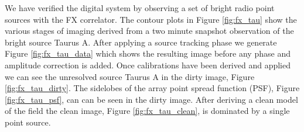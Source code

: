 \documentclass[useAMS,macros,usenatbib]{mn2e}
\begin{document}
%

We have verified the digital system by observing a set of bright radio point sources with the FX correlator.
The contour plots in Figure \ref{fig:fx_tau} show the various stages of imaging derived from a two minute snapshot observation of the bright source Taurus A.
After applying a source tracking phase we generate Figure \ref{fig:fx_tau_data} which shows the resulting image before any phase and amplitude correction is added.
Once calibrations have been derived and applied we can see the unresolved source Taurus A in the dirty image, Figure \ref{fig:fx_tau_dirty}.
The sidelobes of the array point spread function (PSF), Figure \ref{fig:fx_tau_psf}, can can be seen in the dirty image.
After deriving a clean model of the field the clean image, Figure \ref{fig:fx_tau_clean}, is dominated by a single point source.
\end{document}
